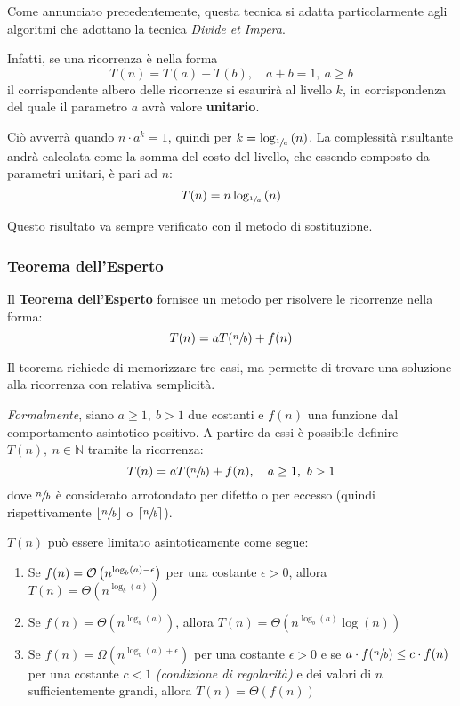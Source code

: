 \documentclass[italian, 10pt]{article}
\begin{document}
Come annunciato precedentemente, questa tecnica si adatta particolarmente agli algoritmi che adottano la tecnica \textit{Divide et Impera}.

Infatti, se una ricorrenza è nella forma
\[ T(n) = T(a) + T(b),\quad a + b = 1,\ a \geq b \]
il corrispondente albero delle ricorrenze si esaurirà al livello \(k\), in corrispondenza del quale il parametro \(a\) avrà valore \textbf{unitario}.

Ciò avverrà quando \(n \cdot a^k = 1\), quindi per \(k = \log_{\sfrac{1}{a}}{(n)}\).
La complessità risultante andrà calcolata come la somma del costo del livello, che essendo composto da parametri unitari, è pari ad \(n\):
\[ T(n) = n \log_{\sfrac{1}{a}}{(n)} \]

Questo risultato va sempre verificato con il metodo di sostituzione.

\subsubsection{Teorema dell'Esperto}
\label{sec:teorema-dell-esperto}

Il \textbf{Teorema dell'Esperto} fornisce un metodo  per risolvere le ricorrenze nella forma:
\[ T(n) = aT(\sfrac{n}{b}) + f(n)\]

Il teorema richiede di memorizzare tre casi, ma permette di trovare una soluzione alla ricorrenza con relativa semplicità.

\bigskip
\textit{Formalmente}, siano \(a \geq 1,\ b > 1\) due costanti e \(f(n)\) una funzione dal comportamento asintotico positivo.
A partire da essi è possibile definire \(T(n),\ n \in \mathbb{N}\) tramite la ricorrenza:
\[ T(n) = aT(\sfrac{n}{b}) + f(n) , \quad a \geq 1,\ b > 1 \]
dove \(\sfrac{n}{b}\) è considerato arrotondato per difetto o per eccesso (quindi rispettivamente \(\lfloor\sfrac{n}{b}\rfloor\) o \(\lceil\sfrac{n}{b}\rceil\)).

\(T(n)\) può essere limitato asintoticamente come segue:

\begin{enumerate}[label=\arabic*), ref=(\arabic*)]
  \item\label{enum:teorema-esperto-1} Se \(f(n) = \mathcal{O}\left(n^{\log_b(a) - \epsilon}\right)\) per una costante \(\epsilon > 0\), allora \(T(n) = \Theta\left(n^{\log_b (a)}\right)\)
  \item\label{enum:teorema-esperto-2} Se \(f(n) = \Theta\left(n^{\log_b(a)}\right)\), allora \(T(n) = \Theta\left(n^{\log_b(a)} \log{(n)}\right)\)
  \item\label{enum:teorema-esperto-3} Se \(f(n) = \Omega\left(n^{\log_b(a) + \epsilon}\right)\) per una costante \(\epsilon > 0\) e se \(a \cdot f(\sfrac{n}{b}) \leq c \cdot f(n)\) per una costante \(c < 1\) \textit{(condizione di regolarità)} e dei valori di \(n\) sufficientemente grandi, allora \(T(n) = \Theta\left(f(n)\right)\)
\end{enumerate}
\end{document}

